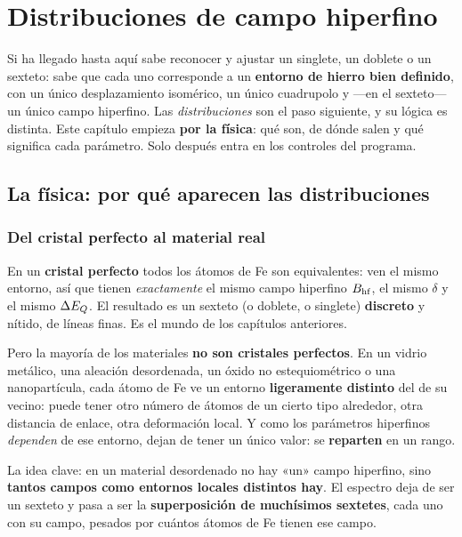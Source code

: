 \chapter{Distribuciones de campo hiperfino}
\label{ch:distribuciones}

Si ha llegado hasta aquí sabe reconocer y ajustar un singlete, un doblete o un
sexteto: sabe que cada uno corresponde a un \textbf{entorno de hierro bien
definido}, con un único desplazamiento isomérico, un único cuadrupolo y —en el
sexteto— un único campo hiperfino. Las \emph{distribuciones} son el paso
siguiente, y su lógica es distinta. Este capítulo empieza \textbf{por la física}:
qué son, de dónde salen y qué significa cada parámetro. Solo después entra en los
controles del programa.

\section{La física: por qué aparecen las distribuciones}
\label{sec:fisica-dist}

\subsection{Del cristal perfecto al material real}

En un \textbf{cristal perfecto} todos los átomos de Fe son equivalentes: ven el
mismo entorno, así que tienen \emph{exactamente} el mismo campo hiperfino
$B_{\mathrm{hf}}$, el mismo $\delta$ y el mismo $\Delta E_{Q}$. El resultado es un sexteto (o
doblete, o singlete) \textbf{discreto} y nítido, de líneas finas. Es el mundo de
los capítulos anteriores.

Pero la mayoría de los materiales \textbf{no son cristales perfectos}. En un vidrio
metálico, una aleación desordenada, un óxido no estequiométrico o una
nanopartícula, cada átomo de Fe ve un entorno \textbf{ligeramente distinto} del de
su vecino: puede tener otro número de átomos de un cierto tipo alrededor, otra
distancia de enlace, otra deformación local. Y como los parámetros hiperfinos
\emph{dependen} de ese entorno, dejan de tener un único valor: se
\textbf{reparten} en un rango.

\begin{nota}
La idea clave: en un material desordenado no hay «un» campo hiperfino, sino
\textbf{tantos campos como entornos locales distintos hay}. El espectro deja de
ser un sexteto y pasa a ser la \textbf{superposición de muchísimos sextetes},
cada uno con su campo, pesados por cuántos átomos de Fe tienen ese campo.
\end{nota}


